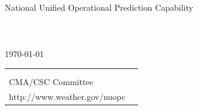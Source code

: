 %



\begin{titlepage}

\begin{center}
{\Large National Unified Operational Prediction Capability} \\
\vspace{.25in}
{\Large {\bf \mytitle}} \\
\vspace{.25in}
{\large {\bf \myversion}} \\
\vspace{.5in}
{\large {\it \myauthors}} \\
\vspace{.25in}
{\large {\today}}
\vspace{.25in}
\end{center}

\begin{latexonly}
\vspace{4.5in}
\begin{tabular}{p{5in}p{.9in}}
\hrulefill \\
\noindent {\bf NUOPC} \\
\noindent CMA/CSC Committee \\
\noindent http://www.weather.gov/nuopc \\
\end{tabular}
\end{latexonly}

\end{titlepage}














